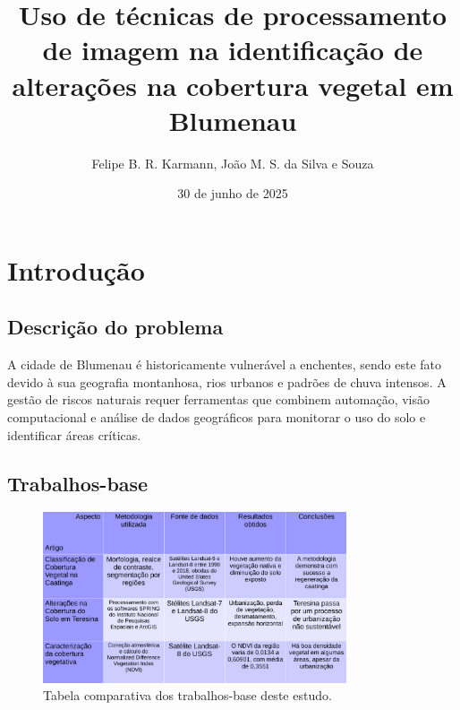 \documentclass{article}
\author{Felipe B. R. Karmann, João M. S. da Silva e Souza}
\date{30 de junho de 2025}
\title{Uso de técnicas de processamento de imagem na identificação de alterações na cobertura vegetal em Blumenau}
\begin{document}
\maketitle

\section{Introdução}
\subsection{Descrição do problema}

A cidade de Blumenau é historicamente vulnerável a enchentes, sendo este fato devido à sua geografia montanhosa, rios urbanos e padrões de chuva intensos. A gestão de riscos naturais requer ferramentas que combinem automação, visão computacional e análise de dados geográficos para monitorar o uso do solo e identificar áreas críticas.

\subsection{Trabalhos-base}

\begin{figure}[H]
  \centering
  \includegraphics[width=0.8\textwidth]{../tabela_comparativa.png}
  \caption{Tabela comparativa dos trabalhos-base deste estudo.}
  \label{Tabela comparativa}
\end{figure}
\end{document}
